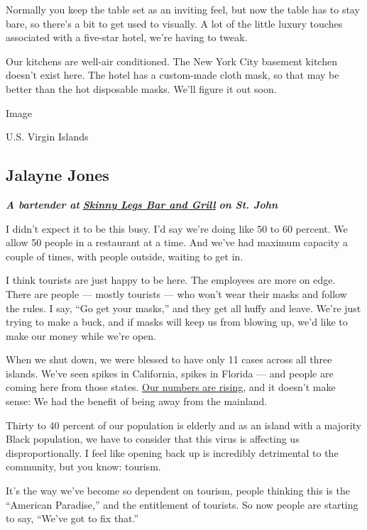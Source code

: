 Normally you keep the table set as an inviting feel, but now the table
has to stay bare, so there's a bit to get used to visually. A lot of the
little luxury touches associated with a five-star hotel, we're having to
tweak.

Our kitchens are well-air conditioned. The New York City basement
kitchen doesn't exist here. The hotel has a custom-made cloth mask, so
that may be better than the hot disposable masks. We'll figure it out
soon.

Image

U.S. Virgin Islands

\hypertarget{jalayne-jones}{%
\subsection{Jalayne Jones}\label{jalayne-jones}}

\emph{\textbf{A bartender at}}
\textbf{\href{http://www.skinnylegsvi.com/}{\emph{Skinny Legs Bar and
Grill}}} \emph{\textbf{on St. John}}

I didn't expect it to be this busy. I'd say we're doing like 50 to 60
percent. We allow 50 people in a restaurant at a time. And we've had
maximum capacity a couple of times, with people outside, waiting to get
in.

I think tourists are just happy to be here. The employees are more on
edge. There are people --- mostly tourists --- who won't wear their
masks and follow the rules. I say, ``Go get your masks,'' and they get
all huffy and leave. We're just trying to make a buck, and if masks will
keep us from blowing up, we'd like to make our money while we're open.

When we shut down, we were blessed to have only 11 cases across all
three islands. We've seen spikes in California, spikes in Florida ---
and people are coming here from those states.
\href{https://www.covid19usvi.com/}{Our numbers are rising}, and it
doesn't make sense: We had the benefit of being away from the mainland.

Thirty to 40 percent of our population is elderly and as an island with
a majority Black population, we have to consider that this virus is
affecting us disproportionally. I feel like opening back up is
incredibly detrimental to the community, but you know: tourism.

It's the way we've become so dependent on tourism, people thinking this
is the ``American Paradise,'' and the entitlement of tourists. So now
people are starting to say, ``We've got to fix that.''

